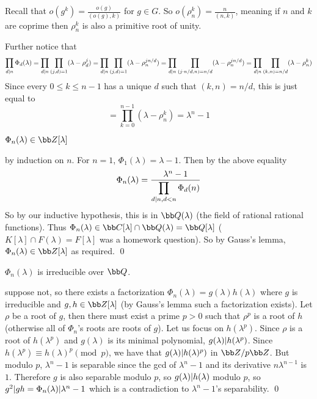 Recall that $o(g^k)=\frac{o(g)}{(o(g),k)}$ for $g\in G$.
So $o(\rho_n^k) = \frac{n}{(n,k)}$, meaning if $n$ and $k$ are coprime then $\rho_n^k$ is also a primitive root of unity.

Further notice that
$$ \prod_{d{\mid} n}\Phi_d(\lambda) = \prod_{d{\mid} n}\prod_{(j,d)=1}(\lambda-\rho_d^j) = \prod_{d{\mid} n}\prod_{(j,d)=1}(\lambda-\rho_n^{jn/d}) =
\prod_{d{\mid} n}\prod_{(j\cdot n/d,n)=n/d}(\lambda-\rho_n^{jn/d}) = \prod_{d{\mid} n}\prod_{(k,n)=n/d}(\lambda-\rho_n^k) $$
Since every $0\leq k\leq n-1$ has a unique $d$ such that $(k,n)=n/d$, this is just equal to
$$ = \prod_{k=0}^{n-1}(\lambda-\rho_n^k) = \lambda^n - 1 $$

\bprop

    $\Phi_n(\lambda)\in{\bb Z}[\lambda]$

\eprop

\Proof by induction on $n$.
For $n=1$, $\Phi_1(\lambda)=\lambda-1$.
Then by the above equality
$$ \Phi_n(\lambda) = {{\lambda^n-1}\over{\displaystyle\prod_{d{\mid}n,d<n}\Phi_d(n)}} $$
So by our inductive hypothesis, this is in ${\bb Q}(\lambda)$ (the field of rational rational functions).
Thus $\Phi_n(\lambda)\in{\bb C}[\lambda]\cap{\bb Q}(\lambda)={\bb Q}[\lambda]$ ($K[\lambda]\cap F(\lambda)=F[\lambda]$ was a homework question).
So by Gauss's lemma, $\Phi_n(\lambda)\in{\bb Z}[\lambda]$ as required.
\qed

\bthrm

    $\Phi_n(\lambda)$ is irreducible over ${\bb Q}$.

\ethrm

\Proof suppose not, so there exists a factorization $\Phi_n(\lambda)=g(\lambda)h(\lambda)$ where $g$ is irreducible and $g,h\in{\bb Z}[\lambda]$ (by Gauss's lemma such a factorization exists).
Let $\rho$ be a root of $g$, then there must exist a prime $p>0$ such that $\rho^p$ is a root of $h$ (otherwise all of $\Phi_n$'s roots are roots of $g$).
Let us focus on $h(\lambda^p)$.
Since $\rho$ is a root of $h(\lambda^p)$ and $g(\lambda)$ is its minimal polynomial, $g(\lambda){\mid} h(\lambda^p)$.
Since $h(\lambda^p)\equiv h(\lambda)^p\pmod p$, we have that $g(\lambda){\mid} h(\lambda)^p)$ in ${\bb Z}/p{\bb Z}$.
But modulo $p$, $\lambda^n-1$ is separable since the gcd of $\lambda^n-1$ and its derivative $n\lambda^{n-1}$ is $1$.
Therefore $g$ is also separable modulo $p$, so $g(\lambda){\mid} h(\lambda)$ modulo $p$, so $g^2{\mid} gh=\Phi_n(\lambda){\mid}\lambda^n-1$ which is a contradiction to $\lambda^n-1$'s separability.
\qed

